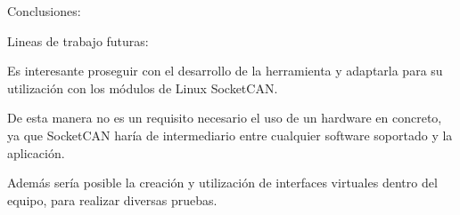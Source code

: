
Conclusiones:



Lineas de trabajo futuras:

Es interesante proseguir con el desarrollo de la herramienta y adaptarla para su utilización con los módulos de Linux SocketCAN.

De esta manera no es un requisito necesario el uso de un hardware en concreto, ya que SocketCAN haría de intermediario entre cualquier software soportado y la aplicación.

Además sería posible la creación y utilización de interfaces virtuales dentro del equipo, para realizar diversas pruebas.